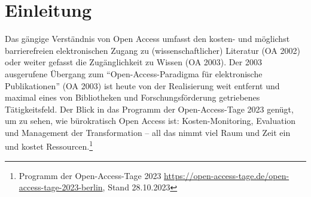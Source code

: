 \documentclass[a4paper,
fontsize=11pt,
oneside,
numbers=noperiodatend,
parskip=half-,
bibliography=totoc,
final
]{scrartcl}
\title{\LARGE{Kamptaler Sakrallandschaften im Wikiversum} \vskip 1em \large{Edits mit Versionsgeschichte: Elementarteilchen offener Wissensproduktion am Beispiel eines Citizen Science-Projektes}}%
\author{Christian Erlinger und Jens Bemme} %
\date{}
\begin{document}
\maketitle
\thispagestyle{fancyplain} 

\begin{abstract}
\noindent
Die Autoren skizzieren, dass insbesondere lokales und regionales Wissen
mit Wikis entsteht und dauerhaft bleibt -- als Regionalia in globalen
offenen Linkzusammenhängen. ``Grass Root Open Access'' bedeutet nicht
nur, Publikationen auf selbst gezimmerte Art und Weise frei und unter
offener Lizenz zu publizieren (``I have published my pdf under a cc
license on my personal website''). ``Grass Root Open Science'' bedeutet
auch, den Inhalt, die Daten und Bilder -- das Wissen einer
publizistischen Arbeit an sich frei, offen und reproduzierbar zu
veröffentlichen. Am Beispiel der ``Wikifizierung'' einer gedruckten,
heimatkundlichen Buchpublikation wird gezeigt, wie mit
Graswurzelstrategien im Wikiversums Open Science entsteht.

Wir skizzieren einen solchen Prozess als `linked open': Methoden und
Effekte regionaler Datenpflege als demokratisierende Praxis mittels
Citizen Science, mit Blick auf Technologien und Gemeinschaften.
Potentiell beeinflussen wir mit offenen, wiki-basierten und damit
dezentralen Wissenssystemen die Kalkulation und Rentabilität
öffentlicher und quasi-öffentlicher Investitionen in Bildungsressourcen,
Informationsinfrastrukturen, Forschung und Entwicklung.
\end{abstract}

\hypertarget{einleitung}{%
\section{Einleitung}\label{einleitung}}

Das gängige Verständnis von Open Access umfasst den kosten- und
möglichst barrierefreien elektronischen Zugang zu (wissenschaftlicher)
Literatur (OA 2002) oder weiter gefasst die Zugänglichkeit zu Wissen (OA
2003). Der 2003 ausgerufene Übergang zum \enquote{Open-Access-Pa\-ra\-dig\-ma
für elektronische Publikationen} (OA 2003) ist heute von der
Realisierung weit entfernt und maximal eines von Bibliotheken und
Forschungsförderung getriebenes Tätigkeitsfeld. Der Blick in das
Programm der Open-Access-Tage 2023 genügt, um zu sehen, wie bürokratisch
Open Access ist: Kosten-Monitoring, Evaluation und Management der
Transformation -- all das nimmt viel Raum und Zeit ein und kostet
Ressourcen.\footnote{Programm der Open-Access-Tage 2023
  \url{https://open-access-tage.de/open-access-tage-2023-berlin}, Stand
  28.10.2023}
\end{document}
